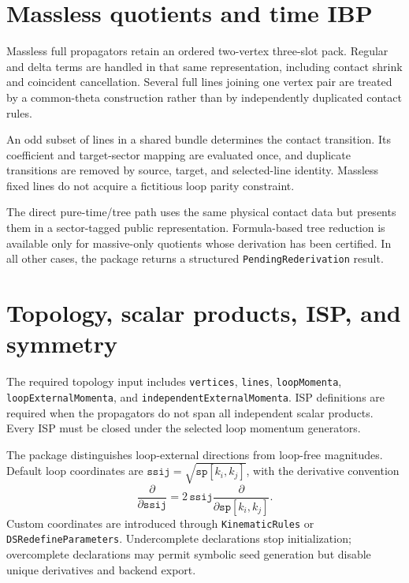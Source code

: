 ﻿\documentclass[a4paper,11pt]{article}
\begin{document}
\section{Massless quotients and time IBP}

Massless full propagators retain an ordered two-vertex three-slot pack. Regular and delta
terms are handled in that same representation, including contact shrink and coincident
cancellation. Several full lines joining one vertex pair are treated by a common-theta
construction rather than by independently duplicated contact rules.

An odd subset of lines in a shared bundle determines the contact transition. Its coefficient
and target-sector mapping are evaluated once, and duplicate transitions are removed by source,
target, and selected-line identity. Massless fixed lines do not acquire a fictitious loop
parity constraint.

The direct pure-time/tree path uses the same physical contact data but presents them in a
sector-tagged public representation. Formula-based tree reduction is available only for
massive-only quotients whose derivation has been certified. In all other cases, the package
returns a structured \texttt{PendingRederivation} result.

\section{Topology, scalar products, ISP, and symmetry}

The required topology input includes \texttt{vertices}, \texttt{lines},
\texttt{loopMomenta}, \texttt{loopExternalMomenta}, and
\texttt{independentExternalMomenta}. ISP definitions are required when the propagators do
not span all independent scalar products. Every ISP must be closed under the selected loop
momentum generators.

The package distinguishes loop-external directions from loop-free magnitudes. Default loop
coordinates are $\texttt{ssij}=\sqrt{\texttt{sp}[k_i,k_j]}$, with the derivative convention
\begin{equation}
 \frac{\partial}{\partial\texttt{ssij}}
 =2\,\texttt{ssij}\frac{\partial}{\partial\texttt{sp}[k_i,k_j]}.
 \label{handbookRootDerivative}
\end{equation}
Custom coordinates are introduced through \texttt{KinematicRules} or
\texttt{DSRedefineParameters}. Undercomplete declarations stop initialization;
overcomplete declarations may permit symbolic seed generation but disable unique
derivatives and backend export.
\end{document}
